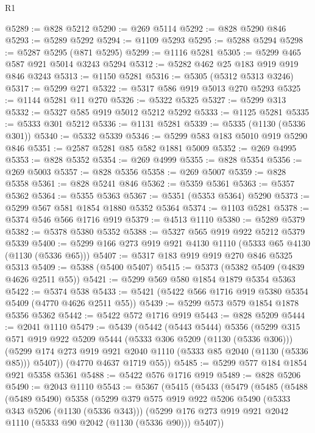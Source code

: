 \begin{lexlean}{R1}
\begin{coremodule}
@5289 := @828 @5212
@5290 := @269 @5114
@5292 := @828 @5290 @846
@5293 := @5289 @5292
@5294 := @1109 @5293
@5295 := @5288 @5294
@5298 := @5287 @5295 (@871 @5295)
@5299 := @1116 @5281
@5305 := @5299 @465 @587 @921 @5014 @3243 @5294
@5312 := @5282 @462 @25 @183 @919 @919 @846 @3243
@5313 := @1150 @5281
@5316 := @5305 (@5312 @5313 @3246)
@5317 := @5299 @271
@5322 := @5317 @586 @919 @5013 @270 @5293
@5325 := @1144 @5281 @11 @270
@5326 := @5322 @5325
@5327 := @5299 @313
@5332 := @5327 @585 @919 @5012 @5212 @5292
@5333 := @1125 @5281
@5335 := @5333 @301 @5212
@5336 := @1131 @5281
@5339 := @5335 (@1130 (@5336 @301))
@5340 := @5332 @5339
@5346 := @5299 @583 @183 @5010 @919 @5290 @846
@5351 := @2587 @5281 @85 @582 @1881 @5009
@5352 := @269 @4995
@5353 := @828 @5352
@5354 := @269 @4999
@5355 := @828 @5354
@5356 := @269 @5003
@5357 := @828 @5356
@5358 := @269 @5007
@5359 := @828 @5358
@5361 := @828 @5241 @846
@5362 := @5359 @5361
@5363 := @5357 @5362
@5364 := @5355 @5363
@5367 := @5351 (@5353 @5364) @5290
@5373 := @5299 @567 @581 @1854 @1880 @5352 @5364
@5374 := @1103 @5281
@5378 := @5374 @546 @566 @1716 @919
@5379 := @4513 @1110
@5380 := @5289 @5379
@5382 := @5378 @5380 @5352
@5388 := @5327 @565 @919 @922 @5212 @5379 @5339
@5400 := @5299 @166 @273 @919 @921 @4130 @1110 (@5333 @65 @4130 (@1130 (@5336 @65)))
@5407 := @5317 @183 @919 @919 @270 @846 @5325 @5313
@5409 := @5388 (@5400 @5407)
@5415 := @5373 (@5382 @5409 (@4839 @4626 @2511 @55))
@5421 := @5299 @569 @580 @1854 @1879 @5354 @5363
@5422 := @5374 @538
@5433 := @5421 (@5422 @566 @1716 @919 @5380 @5354 @5409 (@4770 @4626 @2511 @55))
@5439 := @5299 @573 @579 @1854 @1878 @5356 @5362
@5442 := @5422 @572 @1716 @919
@5443 := @828 @5209
@5444 := @2041 @1110
@5479 := @5439
    (@5442
      (@5443 @5444)
      @5356
      (@5299
        @315
        @571
        @919
        @922
        @5209
        @5444
        (@5333 @306 @5209 (@1130 (@5336 @306)))
        (@5299 @174 @273 @919 @921 @2040 @1110 (@5333 @85 @2040 (@1130 (@5336 @85))) @5407))
      (@4770 @4637 @1719 @55))
@5485 := @5299 @577 @184 @1854 @921 @5358 @5361
@5488 := @5422 @576 @1716 @919
@5489 := @828 @5206
@5490 := @2043 @1110
@5543 := @5367
    (@5415
      (@5433
        (@5479
          (@5485
            (@5488
              (@5489 @5490)
              @5358
              (@5299
                @379
                @575
                @919
                @922
                @5206
                @5490
                (@5333 @343 @5206 (@1130 (@5336 @343)))
                (@5299 @176 @273 @919 @921 @2042 @1110 (@5333 @90 @2042 (@1130 (@5336 @90))) @5407))

\end{coremodule}
\end{lexlean}
